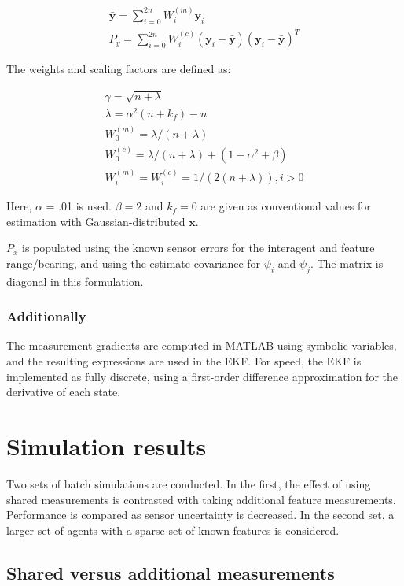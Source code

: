 \documentclass{aiaa-tc}
\newcommand{\B}[1]{\textbf{#1}} %
\begin{document}
\begin{align}
\bar{\B{y}} = \sum_{i=0}^{2n} W_i^{(m)} \B{y}_i \\
P_y = \sum_{i=0}^{2n} W_i^{(c)} (\B{y}_i-\bar{\B{y}})(\B{y}_i-\bar{\B{y}})^T
\end{align}

The weights and scaling factors are defined as:

\begin{align}
\gamma = \sqrt{n+\lambda} \\
\lambda = \alpha^2 (n+k_f)-n \\
W_0^{(m)} = \lambda/(n+\lambda) \\
W_0^{(c)} = \lambda/(n+\lambda) + (1-\alpha^2 + \beta)  \\
W_i^{(m)} = W_i^{(c)} = 1/(2(n+\lambda)), i > 0
\end{align}

Here, $\alpha$ = .01 is used. $\beta = 2$ and $k_f=0$ are given as conventional values for estimation with Gaussian-distributed $\B{x}$.\cite{gyorgy2014}

$P_x$ is populated using the known sensor errors for the interagent and feature range/bearing, and using the estimate covariance for $\psi_i$ and $\psi_j$. The matrix is diagonal in this formulation.

\subsubsection{Additionally}

The measurement gradients are computed in MATLAB using symbolic variables, and the resulting expressions are used in the EKF. For speed, the EKF is implemented as fully discrete, using a first-order difference approximation for the derivative of each state.

\section{Simulation results}

Two sets of batch simulations are conducted. In the first, the effect of using shared measurements is contrasted with taking additional feature measurements. Performance is compared as sensor uncertainty is decreased. In the second set, a larger set of agents with a sparse set of known features is considered.

\subsection{Shared versus additional measurements}
\end{document}
